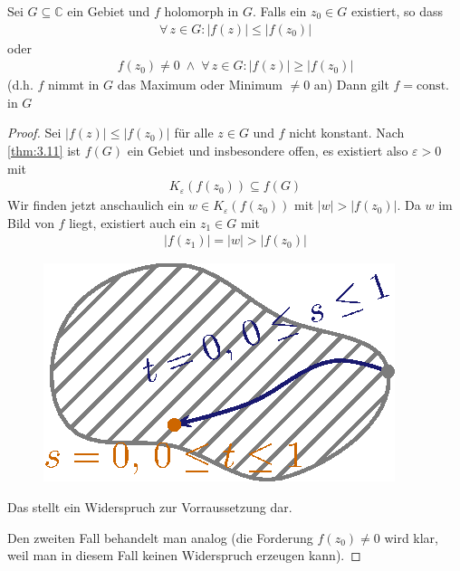 \documentclass[a4paper,10pt]{scrbook}
\begin{document}
\begin{theorem}[Maximumprinzip I] \label{thm:3.12}
  Sei $G \subseteq \mathbb{C}$ ein Gebiet und $f$ holomorph in $G$. Falls ein $z_0 \in G$ existiert, so dass
  \begin{align}
    \forall \, z \in G : |f(z)| \leq |f(z_0)| \label{eq:3.12stern1} \tag{$\ast$}
  \end{align}
  oder
  \begin{align*}
    f(z_0) \neq 0 \; \land \; \forall \, z \in G : |f(z)| \geq |f(z_0)|
  \end{align*}
  (d.h. $f$ nimmt in $G$ das Maximum oder Minimum $\neq 0$ an) Dann gilt $f = \mathrm{const.}$ in $G$

  \begin{proof}
    Sei $|f(z)| \leq |f(z_0)|$ für alle $z \in G$ und $f$ nicht konstant.
    Nach \ref{thm:3.11} ist $f(G)$ ein Gebiet und insbesondere offen, es existiert also $\varepsilon > 0$ mit
    \begin{align*}
      K_\varepsilon(f(z_0)) \subseteq f(G)
    \end{align*}
    Wir finden jetzt anschaulich ein $w \in K_\varepsilon(f(z_0))$ mit $|w| > |f(z_0)|$.
    Da $w$ im Bild von $f$ liegt, existiert auch ein $z_1 \in G$ mit
    \begin{align*}
      |f(z_1)| = |w| > |f(z_0)|
    \end{align*}
    \begin{figure}[H]
      \centering
      \includegraphics[scale=0.2]{images/ana3-tmp-27}
    \end{figure}
    Das stellt ein Widerspruch zur Vorraussetzung dar.

    Den zweiten Fall behandelt man analog (die Forderung $f(z_0) \neq 0$ wird klar, weil man in diesem Fall keinen Widerspruch erzeugen kann).
  \end{proof}
\end{theorem}
\end{document}
